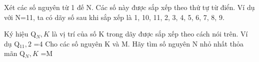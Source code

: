 Xét các số nguyên từ 1 đế N. Các số này được sắp xếp theo thứ tự từ điển. Ví dụ với N=11, ta có dãy số sau khi sắp xếp là 1, 10, 11, 2, 3, 4, 5, 6, 7, 8, 9.

Ký hiệu Q$_N,K $ là vị trí của số K trong dãy được sắp xếp theo cách nói trên. Ví dụ Q$_11,2 $ =4 Cho các số nguyên K và M. Hãy tìm số nguyên N nhỏ nhất thỏa mãn Q$_N,K $ =M

\